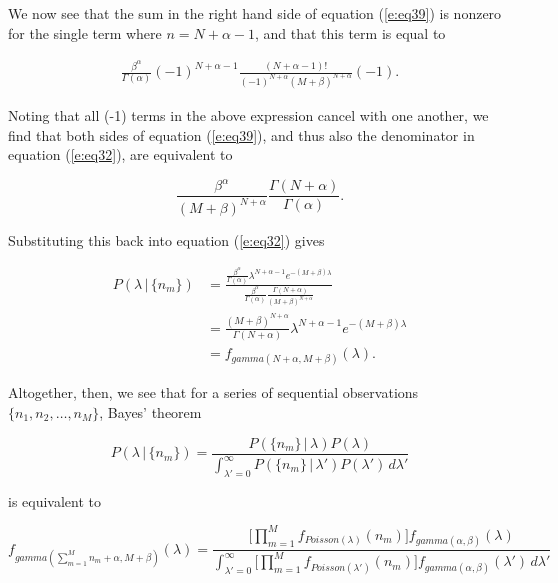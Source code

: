 \documentclass[12pt]{article}
\begin{document}
We now see that the sum in the right hand side of equation (\ref{e:eq39}) is nonzero for the single term where $n = N + \alpha - 1$, and that this term is equal to

\begin{align}
\frac{\beta^{\alpha}}{\Gamma(\alpha)} (-1)^{N + \alpha - 1} \frac{(N + \alpha - 1)!}{(-1)^{N + \alpha} (M + \beta)^{N + \alpha}}(-1).
\end{align}

Noting that all (-1) terms in the above expression cancel with one another, we find that both sides of equation (\ref{e:eq39}), and thus also the denominator in equation (\ref{e:eq32}), are equivalent to

\begin{equation}
\label{e:eq51}
\frac{\beta^{\alpha}}{(M + \beta)^{N + \alpha}}\frac{\Gamma(N + \alpha)}{\Gamma(\alpha)}.
\end{equation}

Substituting this back into equation (\ref{e:eq32}) gives 

\begin{align}
P(\lambda\,|\,\{n_m\}) &= \frac{\frac{\beta^{\alpha}}{\Gamma(\alpha)} \lambda^{N + \alpha - 1} e^{-(M + \beta) \lambda}}{\frac{\beta^{\alpha}}{\Gamma(\alpha)}\frac{\Gamma(N + \alpha)}{(M + \beta)^{N + \alpha}}} \\[5pt]
&= \frac{(M + \beta)^{N + \alpha}}{\Gamma(N + \alpha)} \lambda^{N + \alpha - 1} e^{-(M + \beta) \lambda} \\[5pt]
&= f_{gamma(N + \alpha,M + \beta)}(\lambda).
\end{align}

Altogether, then, we see that for a series of sequential observations $\{n_1, n_2, \ldots, n_M\}$, Bayes' theorem

\begin{equation}
P(\lambda\,|\,\{n_m\}) = \frac{P(\{n_m\}\,|\,\lambda) P(\lambda)}{\int_{\lambda' = 0}^{\infty} P(\{n_m\}\,|\,\lambda') P(\lambda') \, d\lambda'}
\end{equation}

is equivalent to

\begin{equation}
f_{gamma(\sum_{m = 1}^{M} n_m + \alpha,M + \beta)}(\lambda) = \frac{\Big[\prod_{m = 1}^{M} f_{Poisson(\lambda)}(n_m)\Big] f_{gamma(\alpha,\beta)}(\lambda)}{\int_{\lambda' = 0}^{\infty} \Big[\prod_{m = 1}^{M} f_{Poisson(\lambda')}(n_m)\Big] f_{gamma(\alpha,\beta)}(\lambda') \, d\lambda'}
\end{equation}
\end{document}
